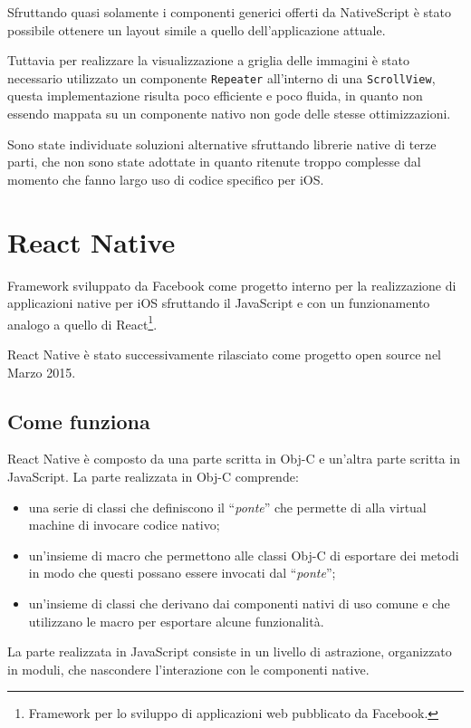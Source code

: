 Sfruttando quasi solamente i componenti generici offerti da NativeScript è stato possibile ottenere un layout simile a quello dell'applicazione attuale.

Tuttavia per realizzare la visualizzazione a griglia delle immagini è stato necessario utilizzato un componente \texttt{Repeater} all'interno di una \texttt{ScrollView}, questa implementazione risulta poco efficiente e poco fluida, in quanto non essendo mappata su un componente nativo non gode delle stesse ottimizzazioni.

Sono state individuate soluzioni alternative sfruttando librerie native di terze parti, che non sono state adottate in quanto ritenute troppo complesse dal momento che fanno largo uso di codice specifico per iOS.

\FloatBarrier
\section{React Native}

Framework sviluppato da Facebook come progetto interno per la realizzazione di applicazioni native per iOS sfruttando il JavaScript e con un funzionamento analogo a quello di React\footnote{Framework per lo sviluppo di applicazioni web pubblicato da Facebook.}.

React Native è stato successivamente rilasciato come progetto open source nel Marzo 2015.

\subsection{Come funziona}

React Native è composto da una parte scritta in Obj-C e un'altra parte scritta in JavaScript.
La parte realizzata in Obj-C comprende:
\begin{itemize}
\item una serie di classi che definiscono il ``\textit{ponte}'' che permette di alla virtual machine di invocare codice nativo;
\item un'insieme di macro che permettono alle classi Obj-C di esportare dei metodi in modo che questi possano essere invocati dal ``\textit{ponte}'';
\item un'insieme di classi che derivano dai componenti nativi di uso comune e che utilizzano le macro per esportare alcune funzionalità.
\end{itemize}
La parte realizzata in JavaScript consiste in un livello di astrazione, organizzato in moduli, che nascondere l'interazione con le componenti native.

